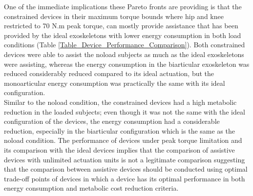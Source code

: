 \documentclass[10pt,letterpaper]{article}
\begin{document}
One of the immediate implications these Pareto fronts are providing is that the constrained devices in their maximum torque bounds where hip and knee restricted to 70 N.m peak torque, can mostly provide assistance that has been provided by the ideal exoskeletons with lower energy consumption in both load conditions (Table \ref{Table_Device_Performance_Comparison}).  Both constrained devices were able to assist the noload subjects as much as the ideal exoskeletons were assisting, whereas the energy consumption in the biarticular exoskeleton was reduced considerably reduced compared to its ideal actuation, but the monoarticular energy consumption was practically the same with its ideal configuration.\\
Similar to the noload condition, the constrained devices had a high metabolic reduction in the loaded subjects; even though it was not the same with the ideal configuration of the devices, the energy consumption had a considerable reduction, especially in the biarticular configuration which is the same as the noload condition.
The performance of devices under peak torque limitation and its comparison with the ideal devices implies that the comparison of assistive devices with unlimited actuation units is not a legitimate comparison suggesting that the comparison between assistive devices should be conducted using optimal trade-off points of devices in which a device has its optimal performance in both energy consumption and metabolic cost reduction criteria.\\
\end{document}
